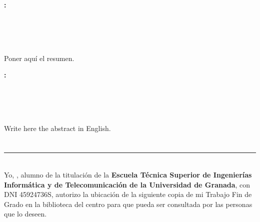 \chapter*{}

\cleardoublepage
\thispagestyle{empty}


\begin{center}
	\large\bfseries \myTitle: \mySubTitle \\
\end{center}
\begin{center}
	\myName\\
\end{center}

\\

\vspace{0.7cm}
\\

Poner aquí el resumen.

\cleardoublepage
\thispagestyle{empty}

\begin{center}
	\large\bfseries \myTitleENGLISH: \mySubTitleENGLISH \\
\end{center}
\begin{center}
	\myName \\
\end{center}

\\

\vspace{0.7cm}
\\

Write here the abstract in English.

\chapter*{}
\thispagestyle{empty}


\noindent\rule[-1ex]{\textwidth}{2pt}\\[4.5ex]

Yo, \textbf{\myName}, alumno de la titulación \myDegree de la \textbf{Escuela Técnica Superior
de Ingenierías Informática y de Telecomunicación de la Universidad de Granada}, con DNI 45924736S, autorizo la
ubicación de la siguiente copia de mi Trabajo Fin de Grado en la biblioteca del centro para que pueda ser
consultada por las personas que lo deseen.

